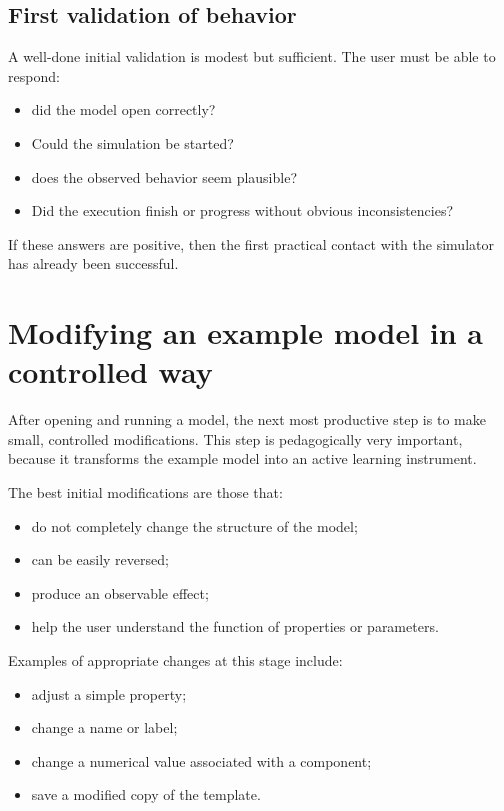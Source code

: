 \subsection{First validation of behavior}
\label{subsec:cap4_primeira_validacao}

A well-done initial validation is modest but sufficient. The user must be able to respond:
\begin{itemize}
\item did the model open correctly?
\item Could the simulation be started?
\item does the observed behavior seem plausible?
\item Did the execution finish or progress without obvious inconsistencies?
\end{itemize}

If these answers are positive, then the first practical contact with the simulator has already been successful.

\section{Modifying an example model in a controlled way}
\label{sec:cap4_modificando_modelo_controlado}

After opening and running a model, the next most productive step is to make small, controlled modifications. This step is pedagogically very important, because it transforms the example model into an active learning instrument.

The best initial modifications are those that:
\begin{itemize}
\item do not completely change the structure of the model;
\item can be easily reversed;
\item produce an observable effect;
\item help the user understand the function of properties or parameters.
\end{itemize}

Examples of appropriate changes at this stage include:
\begin{itemize}
\item adjust a simple property;
\item change a name or label;
\item change a numerical value associated with a component;
\item save a modified copy of the template.
\end{itemize}

